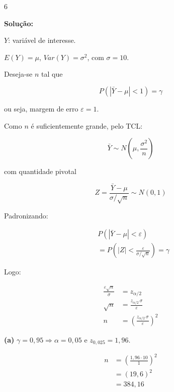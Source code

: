 \documentclass[8pt, a4paper, landscape]{extarticle}
\begin{document}
\begin{multicols}{6}
\vspace{0.3cm}

\textbf{Solução:}

$Y$: variável de interesse.

$E(Y) = \mu$, \quad $Var(Y) = \sigma^2$, com $\sigma = 10$.

Deseja-se $n$ tal que

\begin{equation*}
P\left(|\bar{Y} - \mu| < 1\right) = \gamma
\end{equation*}

ou seja, margem de erro $\varepsilon = 1$.

Como $n$ é suficientemente grande, pelo TCL:

\begin{equation*}
\bar{Y} \sim N\left(\mu, \frac{\sigma^2}{n}\right)
\end{equation*}

com quantidade pivotal

\begin{equation*}
Z = \frac{\bar{Y} - \mu}{\sigma/\sqrt{n}} \sim N(0,1)
\end{equation*}

Padronizando:

\begin{equation*}
\begin{split}
&P\left(|\bar{Y} - \mu| < \varepsilon\right) \\
&= P\left(|Z| < \frac{\varepsilon}{\sigma/\sqrt{n}}\right) = \gamma
\end{split}
\end{equation*}

Logo:

\begin{equation*}
\begin{split}
\frac{\varepsilon\sqrt{n}}{\sigma} &= z_{\alpha/2} \\
\sqrt{n} &= \frac{z_{\alpha/2}\,\sigma}{\varepsilon} \\
n &= \left(\frac{z_{\alpha/2}\,\sigma}{\varepsilon}\right)^2
\end{split}
\end{equation*}

\vspace{0.2cm}

\textbf{(a)} $\gamma = 0,95 \Rightarrow \alpha = 0,05$ e $z_{0,025} = 1,96$.

\begin{equation*}
\begin{split}
n &= \left(\frac{1,96 \cdot 10}{1}\right)^2 \\
&= (19,6)^2 \\
&= 384,16
\end{split}
\end{equation*}


\end{multicols}
\end{document}
